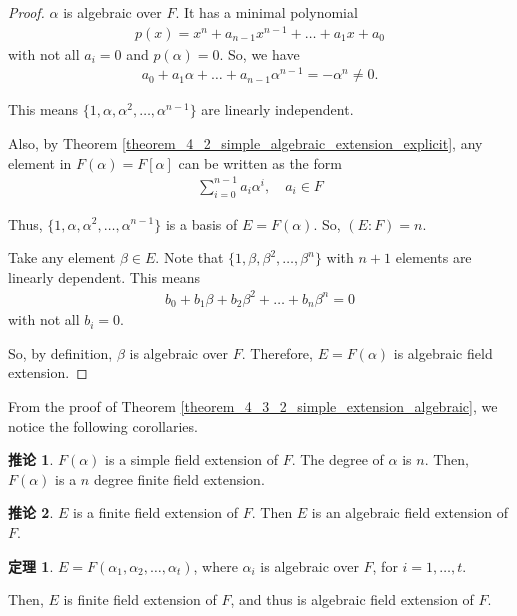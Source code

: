 \documentclass[utf8]{ctexbook}
\theoremstyle{definition}
\newtheorem{prototheorem}{定理}[section]
\newenvironment{theorem}
   {\colorlet{shadecolor}{pink!30}\begin{shaded}\begin{prototheorem}}
   {\end{prototheorem}\end{shaded}}
\newtheorem{corollary}{推论}[section]
\begin{document}
\begin{proof}
$\alpha$ is algebraic over $F$. It has a minimal polynomial
\begin{align*}
p(x) = x^n + a_{n-1} x^{n-1} + \ldots + a_1 x + a_0
\end{align*}
with not all $a_i = 0$ and $p(\alpha)=0$. So, we have
\begin{align*}
a_0 + a_1 \alpha + \ldots + a_{n-1} \alpha^{n-1} = - \alpha^n \neq 0 .
\end{align*}

This means $\{ 1, \alpha, \alpha^2, \ldots, \alpha^{n-1} \}$ are linearly independent.

Also, by Theorem \ref{theorem_4_2_simple_algebraic_extension_explicit}, any element in $F(\alpha) = F[\alpha]$ can be written as the form
\begin{align*}
\sum_{i=0} ^{n-1} a_i \alpha^i, \quad a_i \in F
\end{align*}

Thus, $\{ 1, \alpha, \alpha^2, \ldots, \alpha^{n-1} \}$  is a basis of $E = F(\alpha)$. So, $(E:F)=n$.

Take any element $\beta \in E$. Note that $\{ 1, \beta, \beta^2, \ldots, \beta^n \}$ with $n+1$ elements are linearly dependent. This means
\begin{align*}
b_0 + b_1 \beta + b_2 \beta^2 + \ldots + b_n \beta^n = 0
\end{align*}
with not all $b_i =0$.

So, by definition, $\beta$ is algebraic over $F$. Therefore, $E=F(\alpha)$ is algebraic field extension.

\end{proof}


From the proof of Theorem \ref{theorem_4_3_2_simple_extension_algebraic}, we notice the following corollaries.

\begin{corollary}\label{corollary_4_3_2_simple_extension_algebraic}
$F(\alpha)$ is a simple field extension of $F$. The degree of $\alpha$ is $n$. Then, $F(\alpha)$ is a $n$ degree finite field extension.
\end{corollary}

\begin{corollary}\label{corollary_4_3_3_simple_extension_algebraic}
$E$ is a finite field extension of $F$. Then $E$ is an algebraic field extension of $F$.
\end{corollary}


\begin{theorem}
\label{theorem_4_3_3_finite_extension_algebraic}
$E = F(\alpha_1, \alpha_2, \ldots, \alpha_t)$, where $\alpha_i$ is algebraic over $F$, for $i=1, \ldots, t$.

Then, $E$ is finite field extension of $F$, and thus is algebraic field extension of $F$.
\end{theorem}
\end{document}
